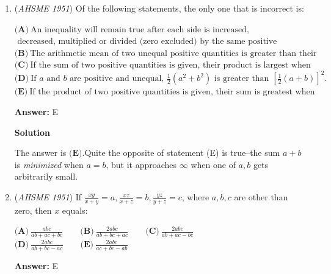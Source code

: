 \begin{enumerate}
 $\textbf{(A)}\ x = 1\qquad\textbf{(B)}\ 0 < x < 1\qquad\textbf{(C)}\ 1 < x < 2\qquad\textbf{(D)}\ x\text{ is infinite}$
$\textbf{(E)}\ x > 2\text{ but finite}$

 \textbf{Answer: }C



\textbf{Solution}

We note that $x^2=1+\sqrt{1+\sqrt{1+\sqrt{1+\cdots}}}=1+x$. By the quadratic formula, $x=\dfrac{1\pm \sqrt{5}}{2}$. Because there are only positive square roots in $x$, $x$ must be positive, thus, it is $\dfrac{1+\sqrt{5}}{2}\approx 1.618$. Thus, $\boxed{\textbf{(C)}\ 1 < x < 2}$.

 


	\item (\textit{AHSME 1951}) Of the following statements, the only one that is incorrect is:


 $\textbf{(A)}\ \text{An inequality will remain true after each side is increased,}$ $\text{ decreased, multiplied or divided (zero excluded) by the same positive quantity.}$
$\textbf{(B)}\ \text{The arithmetic mean of two unequal positive quantities is greater than their geometric mean.}$
$\textbf{(C)}\ \text{If the sum of two positive quantities is given, their product is largest when they are equal.}$
$\textbf{(D)}\ \text{If }a\text{ and }b\text{ are positive and unequal, }\frac{1}{2}(a^{2}+b^{2})\text{ is greater than }[\frac{1}{2}(a+b)]^{2}.$
$\textbf{(E)}\ \text{If the product of two positive quantities is given, their sum is greatest when they are equal.}$

 \textbf{Answer: }E



\textbf{Solution}

The answer is $\boxed{\textbf{(E)}}$.Quite the opposite of statement (E) is true--the sum $a+b$ is \textit{minimized} when $a=b$, but it approaches $\infty$ when one of $a,b$ gets arbitrarily small.

 


	\item (\textit{AHSME 1951}) If $\frac{xy}{x+y}= a,\frac{xz}{x+z}= b,\frac{yz}{y+z}= c$, where $a, b, c$ are other than zero, then $x$ equals: 


 $\textbf{(A)}\ \frac{abc}{ab+ac+bc}\qquad\textbf{(B)}\ \frac{2abc}{ab+bc+ac}\qquad\textbf{(C)}\ \frac{2abc}{ab+ac-bc}$
$\textbf{(D)}\ \frac{2abc}{ab+bc-ac}\qquad\textbf{(E)}\ \frac{2abc}{ac+bc-ab}$

 \textbf{Answer: }E




\end{enumerate}

